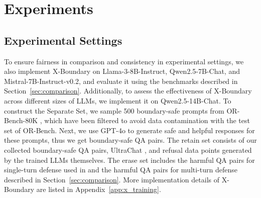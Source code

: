 \section{Experiments}
\subsection{Experimental Settings}
To ensure fairness in comparison and consistency in experimental settings, we also implement X-Boundary on Llama-3-8B-Instruct, Qwen2.5-7B-Chat, and Mistral-7B-Instruct-v0.2, and evaluate it using the benchmarks described in Section~\ref{sec:comparison}.
%
Additionally, to assess the effectiveness of X-Boundary across different sizes of LLMs, we implement it on Qwen2.5-14B-Chat.
%
To construct the Separate Set, we sample 500 boundary-safe prompts from OR-Bench-80K \cite{orbench}, which have been filtered to avoid data contamination with the test set of OR-Bench. 
%
Next, we use GPT-4o to generate safe and helpful responses for these prompts, thus we get boundary-safe QA pairs.
%
The retain set consists of our collected boundary-safe QA pairs, UltraChat \cite{ultrachat}, and refusal data points generated by the trained LLMs themselves.
%
The erase set includes the harmful QA pairs for single-turn defense used in \citet{circuit_breaker} and the harmful QA pairs for multi-turn defense described in Section~\ref{sec:comparison}.
%
More implementation details of X-Boundary are listed in Appendix~\ref{app:x_training}.
